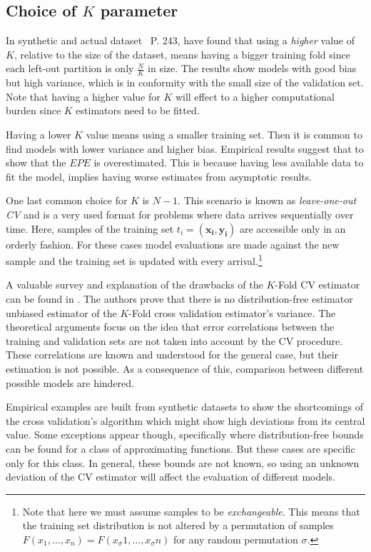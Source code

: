 \begin{appendices}
\section{Choice of \texorpdfstring{$K$ parameter}{Lg} }\label{appx:sec:optimalKfoldNumber}

In synthetic and actual dataset~\textcite{hastie-elemstatslearn} P.
243, have found that using a \textit{higher} value of $K$, relative to the size of the dataset, means having a bigger training fold since each left-out partition is only $\frac{N}{K}$ in size.
The results show models with good bias but high variance, which is in conformity with the small size of the validation set.
Note that having a higher value for $K$ will effect to a higher computational burden since $K$ estimators need to be fitted.

Having a lower $K$ value means using a smaller training set.
Then it is common to find models with lower variance and higher bias.
Empirical results suggest that to show that the $EPE$ is overestimated.
This is because having less available data to fit the model, implies having worse estimates from asymptotic results.

One last common choice for $K$ is $N-1$.
This scenario is known as \textit{leave-one-out CV} and is a very used format for problems where data arrives sequentially over time.
Here, samples of the training set $t_i = ( \boldsymbol{x_i} , \boldsymbol{y_i} )$ are accessible only in an orderly fashion.
For these cases model evaluations are made against the new sample and the training set is updated with every arrival.\footnote{Note that here we must assume samples to be \textit{exchangeable}.
	This means that the training set distribution is not altered by a permutation of samples $F(x_1,\ldots,x_n ) = F(x_\sigma{1},\ldots,x_\sigma{n})$ for any random permutation $\sigma$.}

A valuable survey and explanation of the drawbacks of the $K$-Fold CV estimator can be found in \textcite{bengio-unbiasedCvEstimator}.
The authors prove that there is no distribution-free estimator unbiased estimator of the $K$-Fold cross validation estimator's variance.
The theoretical arguments focus on the idea that error correlations between the training and validation sets are not taken into account by the CV procedure.
These correlations are known and understood for the general case, but their estimation is not possible.
As a consequence of this, comparison between different possible models are hindered.

Empirical examples are built from synthetic datasets to show the shortcomings of the cross validation's algorithm which might show high deviations from its central value.
Some exceptions appear though, specifically where distribution-free bounds can be found for a class of approximating functions.
But these cases are specific only for this class.
In general, these bounds are not known, so using an unknown deviation of the CV estimator will affect the evaluation of different models.


\end{appendices}
